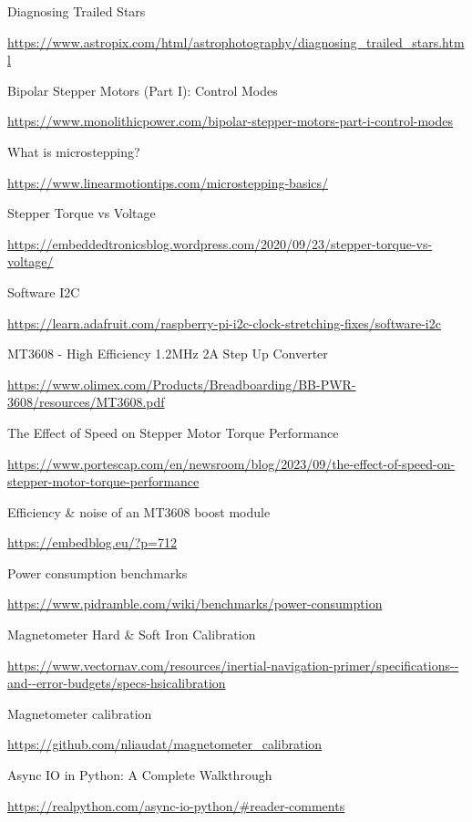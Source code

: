 \documentclass[]{article}
\begin{document}
\begin{thebibliography}{9}
	 Diagnosing Trailed Stars
	
	\url{https://www.astropix.com/html/astrophotography/diagnosing_trailed_stars.html}
	
	Bipolar Stepper Motors (Part I): Control Modes 
	
	\url{https://www.monolithicpower.com/bipolar-stepper-motors-part-i-control-modes}
	
	What is microstepping?
	
	\url{https://www.linearmotiontips.com/microstepping-basics/}
	
	Stepper Torque vs Voltage
	
	\url{https://embeddedtronicsblog.wordpress.com/2020/09/23/stepper-torque-vs-voltage/}
	
	 Software I2C 
	 
	 \url{https://learn.adafruit.com/raspberry-pi-i2c-clock-stretching-fixes/software-i2c}
	 
	 MT3608 - High Efficiency 1.2MHz 2A Step Up Converter
	
	 \url{https://www.olimex.com/Products/Breadboarding/BB-PWR-3608/resources/MT3608.pdf}
	
	  The Effect of Speed on Stepper Motor Torque Performance 
	
	\url{https://www.portescap.com/en/newsroom/blog/2023/09/the-effect-of-speed-on-stepper-motor-torque-performance}
	 
	 Efficiency \& noise of an MT3608 boost module
	
	\url{https://embedblog.eu/?p=712}
	
	 Power consumption benchmarks
	
	\url{https://www.pidramble.com/wiki/benchmarks/power-consumption}
	
	 Magnetometer Hard \& Soft Iron Calibration
	
	\url{https://www.vectornav.com/resources/inertial-navigation-primer/specifications--and--error-budgets/specs-hsicalibration}
	
	 Magnetometer calibration
	
	\url{https://github.com/nliaudat/magnetometer_calibration}
	
	 Async IO in Python: A Complete Walkthrough
	
	\url{https://realpython.com/async-io-python/#reader-comments}
	

\end{thebibliography}
\end{document}
